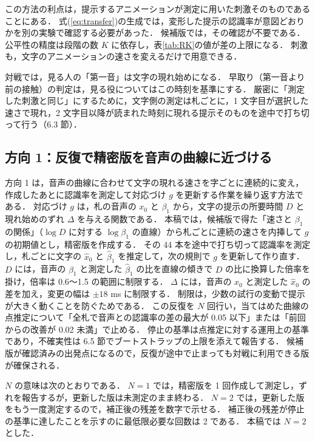 この方法の利点は，提示するアニメーションが測定に用いた刺激そのものであることにある．
式(\ref{eq:transfer})の生成では，変形した提示の認識率が意図どおりかを別の実験で確認する必要があった．
候補版では，その確認が不要である．
公平性の精度は段階の数 $K$ に依存し，表\ref{tab:RK}の値が差の上限になる．
刺激も，文字のアニメーションの速さを変えるだけで用意できる．

対戦では，見る人の「第一音」は文字の現れ始めになる．
早取り（第一音より前の接触）の判定は，見る役についてはこの時刻を基準にする．
厳密に「測定した刺激と同じ」にするために，文字側の測定は札ごとに，1 文字目が選択した速さで現れ，2 文字目以降が読まれた時刻に現れる提示そのものを途中で打ち切って行う（6.3 節）．

\subsection{方向 1：反復で精密版を音声の曲線に近づける}

方向 1 は，音声の曲線に合わせて文字の現れる速さを字ごとに連続的に変え，作成したあとに認識率を測定して対応づけ $g$ を更新する作業を繰り返す方法である．
対応づけ $g$ は，札の音声の $x_0$ と $\beta_1$ から，文字の提示の所要時間 $D$ と現れ始めのずれ $\Delta$ を与える関数である．
本稿では，候補版で得た「速さと $\beta_1$ の関係」（$\log D$ に対する $\log \beta_1$ の直線）から札ごとに連続の速さを内挿して $g$ の初期値とし，精密版を作成する．
その 44 本を途中で打ち切って認識率を測定し，札ごとに文字の $\hat{x}_0$ と $\hat{\beta}_1$ を推定して，次の規則で $g$ を更新して作り直す．
$D$ には，音声の $\beta_1$ と測定した $\hat{\beta}_1$ の比を直線の傾きで $D$ の比に換算した倍率を掛け，倍率は 0.6〜1.5 の範囲に制限する．
$\Delta$ には，音声の $x_0$ と測定した $\hat{x}_0$ の差を加え，変更の幅は $\pm 18$ ms に制限する．
制限は，少数の試行の変動で提示が大きく動くことを防ぐためである．
この反復を $N$ 回行い，当てはめた曲線の点推定について「全札で音声との認識率の差の最大が 0.05 以下」または「前回からの改善が 0.02 未満」で止める．
停止の基準は点推定に対する運用上の基準であり，不確実性は 6.5 節でブートストラップの上限を添えて報告する．
候補版が確認済みの出発点になるので，反復が途中で止まっても対戦に利用できる版が確保される．

$N$ の意味は次のとおりである．
$N = 1$ では，精密版を 1 回作成して測定し，ずれを報告するが，更新した版は未測定のまま終わる．
$N = 2$ では，更新した版をもう一度測定するので，補正後の残差を数字で示せる．
補正後の残差が停止の基準に達したことを示すのに最低限必要な回数は 2 である．
本稿では $N = 2$ とした．

